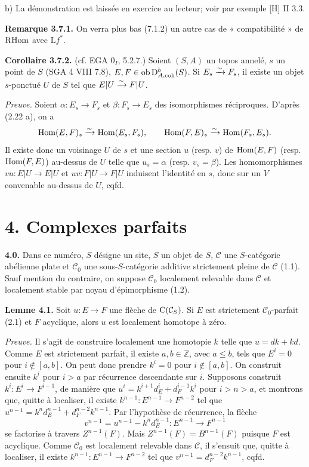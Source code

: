 \documentclass[11pt]{article}
\begin{document}
b) La démonstration est laissée en exercice au lecteur; voir par exemple [H] II 3.3.

\textbf{Remarque 3.7.1.} On verra plus bas (7.1.2) un autre cas de « compatibilité » de \(\mathrm R\!\operatorname{Hom}\) avec \(\mathrm Lf^*\).

\textbf{Corollaire 3.7.2.} (cf. EGA \(0_I\), 5.2.7.) Soient \((S,A)\) un topos annelé, \(s\) un point de \(S\) (SGA 4 VIII 7.8), \(E,F\in\operatorname{ob}\mathrm D^b_{A,\operatorname{coh}}(S)\). Si \(E_s\xrightarrow{\sim} F_s\), il existe un objet \(s\)-ponctué \(U\) de \(S\) tel que \(E|U\xrightarrow{\sim} F|U\).

\emph{Preuve.} Soient \(\alpha:E_s\to F_s\) et \(\beta:F_s\to E_s\) des isomorphismes réciproques. D'après (2.22 a), on a
\[
  \operatorname{Hom}(E,F)_s\xrightarrow{\sim}\operatorname{Hom}(E_s,F_s),
  \qquad
  \operatorname{Hom}(F,E)_s\xrightarrow{\sim}\operatorname{Hom}(F_s,E_s).
\]
Il existe donc un voisinage \(U\) de \(s\) et une section \(u\) (resp. \(v\)) de \(\operatorname{Hom}(E,F)\) (resp. \(\operatorname{Hom}(F,E)\)) au-dessus de \(U\) telle que \(u_s=\alpha\) (resp. \(v_s=\beta\)). Les homomorphismes \(vu:E|U\to E|U\) et \(uv:F|U\to F|U\) induisent l'identité en \(s\), donc sur un \(V\) convenable au-dessus de \(U\), cqfd.

\section*{4. Complexes parfaits}

\textbf{4.0.} Dans ce numéro, \(S\) désigne un site, \(S\) un objet de \(S\), \(\mathcal C\) une \(S\)-catégorie abélienne plate et \(\mathcal C_0\) une sous-\(S\)-catégorie additive strictement pleine de \(\mathcal C\) (1.1). Sauf mention du contraire, on suppose \(\mathcal C_0\) localement relevable dans \(\mathcal C\) et localement stable par noyau d'épimorphisme (1.2).

\textbf{Lemme 4.1.} Soit \(u:E\to F\) une flèche de \(\mathrm C(\mathcal C_S)\). Si \(E\) est strictement \(\mathcal C_0\)-parfait (2.1) et \(F\) acyclique, alors \(u\) est localement homotope à zéro.

\emph{Preuve.} Il s'agit de construire localement une homotopie \(k\) telle que \(u=dk+kd\). Comme \(E\) est strictement parfait, il existe \(a,b\in\mathbb Z\), avec \(a\leq b\), tels que \(E^i=0\) pour \(i\notin[a,b]\). On peut donc prendre \(k^i=0\) pour \(i\notin[a,b]\). On construit ensuite \(k^i\) pour \(i>a\) par récurrence descendante sur \(i\). Supposons construit \(k^i:E^i\to F^{i-1}\), de manière que \(u^i=k^{i+1}d_E^i+d_F^{i-1}k^i\) pour \(i>n>a\), et montrons que, quitte à localiser, il existe \(k^{n-1}:E^{n-1}\to F^{n-2}\) tel que \(u^{n-1}=k^nd_E^{n-1}+d_F^{n-2}k^{n-1}\). Par l'hypothèse de récurrence, la flèche
\[
  v^{n-1}=u^{n-1}-k^nd_E^{n-1}:E^{n-1}\to F^{n-1}
\]
se factorise à travers \(Z^{n-1}(F)\). Mais \(Z^{n-1}(F)=B^{n-1}(F)\) puisque \(F\) est acyclique. Comme \(\mathcal C_0\) est localement relevable dans \(\mathcal C\), il s'ensuit que, quitte à localiser, il existe \(k^{n-1}:E^{n-1}\to F^{n-2}\) tel que \(v^{n-1}=d_F^{n-2}k^{n-1}\), cqfd.
\end{document}

